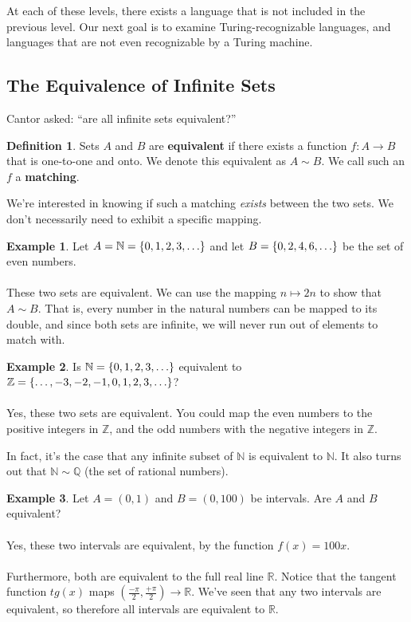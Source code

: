 \documentclass[]{article}
\DeclarePairedDelimiter{\set}{\lbrace}{\rbrace}
\theoremstyle{definition}
\newtheorem*{defn}{Definition}
\newtheorem{ex}{Example}[section]
\begin{document}
    At each of these levels, there exists a language that is not included in the previous level. Our next goal is to examine Turing-recognizable languages, and languages that are not even recognizable by a Turing machine.

    \subsection{The Equivalence of Infinite Sets}
      Cantor asked: ``are all infinite sets equivalent?''

      \begin{defn}
        Sets $A$ and $B$ are \textbf{equivalent} if there exists a function $f: A \to B$ that is one-to-one and onto. We denote this equivalent as $A \sim B$. We call such an $f$ a \textbf{matching}.
      \end{defn}

      We're interested in knowing if such a matching \emph{exists} between the two sets. We don't necessarily need to exhibit a specific mapping.

      \begin{ex}
        Let $A = \mathbb{N} = \set{0, 1, 2, 3, \ldots}$ and let $B = \set{0, 2, 4, 6, \ldots}$ be the set of even numbers.
        \\ \\
        These two sets are equivalent. We can use the mapping $n \mapsto 2n$ to show that $A \sim B$. That is, every number in the natural numbers can be mapped to its double, and since both sets are infinite, we will never run out of elements to match with.
      \end{ex}

      \begin{ex}
        Is $\mathbb{N} = \set{0, 1, 2, 3, \ldots}$ equivalent to $\mathbb{Z} = \set{\ldots, -3, -2, -1, 0, 1, 2, 3, \ldots}$?
        \\ \\
        Yes, these two sets are equivalent. You could map the even numbers to the positive integers in $\mathbb{Z}$, and the odd numbers with the negative integers in $\mathbb{Z}$.
      \end{ex}

      In fact, it's the case that any infinite subset of $\mathbb{N}$ is equivalent to $\mathbb{N}$. It also turns out that $\mathbb{N} \sim \mathbb{Q}$ (the set of rational numbers).

      \begin{ex}
        Let $A = (0, 1)$ and $B = (0, 100)$ be intervals. Are $A$ and $B$ equivalent?
        \\ \\
        Yes, these two intervals are equivalent, by the function $f(x) = 100x$.
        \\ \\
        Furthermore, both are equivalent to the full real line $\mathbb{R}$. Notice that the tangent function $tg(x)$ maps $(\frac{-\pi}{2}, \frac{+\pi}{2}) \to \mathbb{R}$. We've seen that any two intervals are equivalent, so therefore all intervals are equivalent to $\mathbb{R}$.
      \end{ex}
\end{document}
